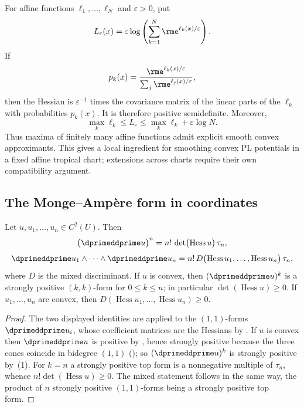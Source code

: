\begin{example}
\label{ex:ch09-log-sum-exp}
For affine functions $\ell_1,\ldots,\ell_N$ and $\varepsilon>0$, put
\[
 L_\varepsilon(x)=\varepsilon\log
       \left(\sum_{k=1}^N\rme^{\ell_k(x)/\varepsilon}\right).
\]
If
\[
 p_k(x)=\frac{\rme^{\ell_k(x)/\varepsilon}}
               {\sum_j\rme^{\ell_j(x)/\varepsilon}},
\]
then the Hessian is $\varepsilon^{-1}$ times the covariance matrix of the
linear parts of the $\ell_k$ with probabilities $p_k(x)$.  It is therefore
positive semidefinite.  Moreover,
\[
 \max_k\ell_k\leq L_\varepsilon
 \leq\max_k\ell_k+\varepsilon\log N.
\]
Thus maxima of finitely many affine functions admit explicit smooth convex
approximants.  This gives a local ingredient for smoothing convex PL
potentials in a fixed affine tropical chart; extensions across charts
require their own compatibility argument.
\end{example}

\subsection{The Monge--Amp\`ere form in coordinates}

\begin{proposition}
\label{prop:ch09-ma-coordinates}
Let $u,u_1,\ldots,u_n\in C^2(U)$.  Then
\[
 \bigl(\dprimeddprime u\bigr)^n
 =n!\,\det\bigl(\operatorname{Hess}u\bigr)\,\tau_n,
\]
\[
 \dprimeddprime u_1\wedge\cdots\wedge\dprimeddprime u_n
 =n!\,D\bigl(\operatorname{Hess}u_1,\ldots,
             \operatorname{Hess}u_n\bigr)\,\tau_n,
\]
where $D$ is the mixed discriminant.  If $u$ is convex, then
$(\dprimeddprime u)^k$ is a strongly positive $(k,k)$-form for
$0\leq k\leq n$; in particular $\det(\operatorname{Hess}u)\geq0$.  If
$u_1,\ldots,u_n$ are convex, then
$D(\operatorname{Hess}u_1,\ldots,\operatorname{Hess}u_n)\geq0$.
\end{proposition}

\begin{proof}
The two displayed identities are
 applied to the $(1,1)$-forms
$\dprimeddprime u_i$, whose coefficient matrices are the Hessians by
.  If $u$ is convex then
$\dprimeddprime u$ is positive by , hence
strongly positive because the three cones coincide in bidegree $(1,1)$
(); so
$(\dprimeddprime u)^k$ is strongly positive by
\,(1).  For $k=n$ a strongly positive
top form is a nonnegative multiple of $\tau_n$, whence
$n!\det(\operatorname{Hess}u)\geq0$.  The mixed statement follows in the same
way, the product of $n$ strongly positive $(1,1)$-forms being a strongly
positive top form.
\end{proof}

